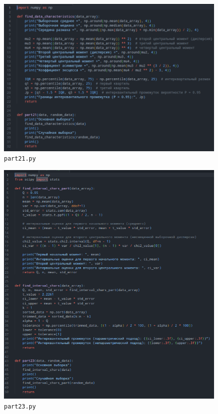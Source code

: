 \documentclass[a4paper,12pt]{article}
\begin{document}
    \begin{figure}[H]
        \centering
        \includegraphics[width=\linewidth]{polytech/stats/homework-2/subfiles/fig/part21}
        \caption{\texttt{part21.py}}
    \end{figure}
    \begin{figure}[H]
        \centering
        \includegraphics[width=\linewidth]{polytech/stats/homework-2/subfiles/fig/part22}
        \caption{\texttt{part23.py}}
    \end{figure}
\end{document}
